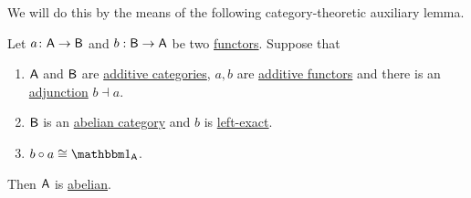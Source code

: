 \documentclass[../../main]{subfiles}
\begin{document}
We will do this by the means of the following category-theoretic auxiliary lemma.
\begin{lemma}\label{lemma:abelian-category-from-adjunction}
  Let \(a\colon \mathsf{A} \to \mathsf{B}\) and \(b: \mathsf{B} \to \mathsf{A}\) be two \hyperref[def:functor]{functors}.
  Suppose that
  \begin{enumerate}
    \item \(\mathsf{A}\) and \(\mathsf{B}\) are \hyperref[def:additive-category]{additive categories}, \(a, b\) are \hyperref[def:additive-functor]{additive functors} and there is an \hyperref[def:adjoint-functors]{adjunction} \(b \dashv a\).
    \item \(\mathsf{B}\) is an \hyperref[def:abelian-category]{abelian category} and \(b\) is \hyperref[def:exact-functor]{left-exact}.
    \item \(b \circ a \cong \id_{\category{A}}\).
  \end{enumerate}
  Then \(\mathsf{A}\) is \hyperref[def:abelian-category]{abelian}.
\end{lemma}
\end{document}
